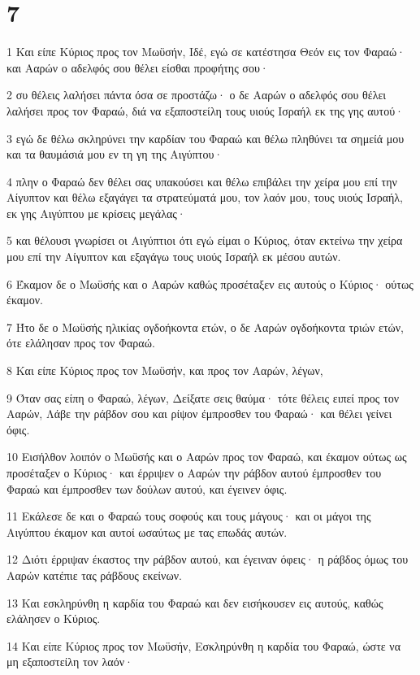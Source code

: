 \chapter{7}

\par 1 Και είπε Κύριος προς τον Μωϋσήν, Ιδέ, εγώ σε κατέστησα Θεόν εις τον Φαραώ· και Ααρών ο αδελφός σου θέλει είσθαι προφήτης σου·
\par 2 συ θέλεις λαλήσει πάντα όσα σε προστάζω· ο δε Ααρών ο αδελφός σου θέλει λαλήσει προς τον Φαραώ, διά να εξαποστείλη τους υιούς Ισραήλ εκ της γης αυτού·
\par 3 εγώ δε θέλω σκληρύνει την καρδίαν του Φαραώ και θέλω πληθύνει τα σημείά μου και τα θαυμάσιά μου εν τη γη της Αιγύπτου·
\par 4 πλην ο Φαραώ δεν θέλει σας υπακούσει και θέλω επιβάλει την χείρα μου επί την Αίγυπτον και θέλω εξαγάγει τα στρατεύματά μου, τον λαόν μου, τους υιούς Ισραήλ, εκ γης Αιγύπτου με κρίσεις μεγάλας·
\par 5 και θέλουσι γνωρίσει οι Αιγύπτιοι ότι εγώ είμαι ο Κύριος, όταν εκτείνω την χείρα μου επί την Αίγυπτον και εξαγάγω τους υιούς Ισραήλ εκ μέσου αυτών.
\par 6 Έκαμον δε ο Μωϋσής και ο Ααρών καθώς προσέταξεν εις αυτούς ο Κύριος· ούτως έκαμον.
\par 7 Ήτο δε ο Μωϋσής ηλικίας ογδοήκοντα ετών, ο δε Ααρών ογδοήκοντα τριών ετών, ότε ελάλησαν προς τον Φαραώ.
\par 8 Και είπε Κύριος προς τον Μωϋσήν, και προς τον Ααρών, λέγων,
\par 9 Όταν σας είπη ο Φαραώ, λέγων, Δείξατε σεις θαύμα· τότε θέλεις ειπεί προς τον Ααρών, Λάβε την ράβδον σου και ρίψον έμπροσθεν του Φαραώ· και θέλει γείνει όφις.
\par 10 Εισήλθον λοιπόν ο Μωϋσής και ο Ααρών προς τον Φαραώ, και έκαμον ούτως ως προσέταξεν ο Κύριος· και έρριψεν ο Ααρών την ράβδον αυτού έμπροσθεν του Φαραώ και έμπροσθεν των δούλων αυτού, και έγεινεν όφις.
\par 11 Εκάλεσε δε και ο Φαραώ τους σοφούς και τους μάγους· και οι μάγοι της Αιγύπτου έκαμον και αυτοί ωσαύτως με τας επωδάς αυτών.
\par 12 Διότι έρριψαν έκαστος την ράβδον αυτού, και έγειναν όφεις· η ράβδος όμως του Ααρών κατέπιε τας ράβδους εκείνων.
\par 13 Και εσκληρύνθη η καρδία του Φαραώ και δεν εισήκουσεν εις αυτούς, καθώς ελάλησεν ο Κύριος.
\par 14 Και είπε Κύριος προς τον Μωϋσήν, Εσκληρύνθη η καρδία του Φαραώ, ώστε να μη εξαποστείλη τον λαόν·
